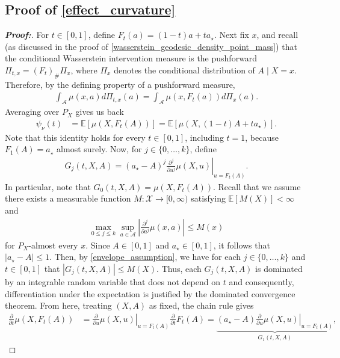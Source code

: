 \documentclass[11pt,twoside]{article}
\theoremstyle{definition}
\theoremstyle{remark}
\begin{document}
\subsection{Proof of \cref{effect_curvature}} \label{effect_curvature_proof}

\begin{proof}[\textbf{Proof:}] For $t\in[0,1]$, define $F_t(a) = (1-t)a+ta_\star$. Next fix $x$, and recall (as discussed in the proof of \cref{wasserstein_geodesic_density_point_mass}) that the conditional Wasserstein intervention measure is the pushforward $\Pi_{t,x} = (F_t)_{\#}\Pi_x$, where $\Pi_x$ denotes the conditional distribution of $A\mid X=x$. Therefore, by the defining property of a pushforward
measure,
\begin{align*}
    \int_{\mathcal{A}} \mu(x,a) d\Pi_{t,x}(a) = \int_{\mathcal{A}} \mu(x,F_t(a)) d\Pi_x(a).
\end{align*}
Averaging over $P_X$ gives us back
\begin{align*}
    \psi_\nu(t) &= \mathbb{E}\left[\mu(X,F_t(A))\right] = \mathbb{E}\left[ \mu(X,(1-t)A+ta_\star)\right].
\end{align*}
Note that this identity holds for every $t\in[0,1]$, including $t=1$, because $F_1(A)=a_\star$ almost surely. Now, for $j\in\{0,\ldots,k\}$, define
\begin{align*}
    G_j(t,X,A) = (a_\star-A)^j \left. \frac{\partial^j}{\partial u^j} \mu(X,u) \right|_{u=F_t(A)}.
\end{align*}
In particular, note that $G_0(t,X,A) = \mu(X,F_t(A))$. Recall that we assume there exists a measurable function $M:\mathcal{X}\to[0,\infty)$ satisfying $\mathbb{E}[M(X)]<\infty$ and
\begin{align} \label{envelope_assumption}
    \max_{0\leq j\leq k} \sup_{a\in\mathcal{A}} \left| \frac{\partial^j}{\partial a^j} \mu(x,a) \right| \leq M(x)
\end{align}
for $P_X$-almost every $x$. Since $A\in[0,1]$ and $a_\star \in[0, 1]$, it follows that $|a_\star-A|\leq 1$. Then, by \cref{envelope_assumption}, we have for each $j\in\{0,\ldots,k\}$ and $t \in [0, 1]$ that $|G_j(t,X,A)| \leq M(X)$. Thus, each $G_j(t,X,A)$ is dominated by an integrable random variable that does not depend on $t$ and consequently, differentiation under the expectation is justified by the dominated convergence theorem. From here, treating
$(X,A)$ as fixed, the chain rule gives
\begin{align*}
    \frac{\partial}{\partial t}
    \mu(X,F_t(A)) &= \left. \frac{\partial}{\partial u} \mu(X,u) \right|_{u=F_t(A)} \frac{\partial}{\partial t}F_t(A) = \underbrace{(a_\star-A) \left. \frac{\partial}{\partial u} \mu(X,u) \right|_{u=F_t(A)}}_{G_1(t,X,A)},

\end{align*}
\end{proof}
\end{document}
